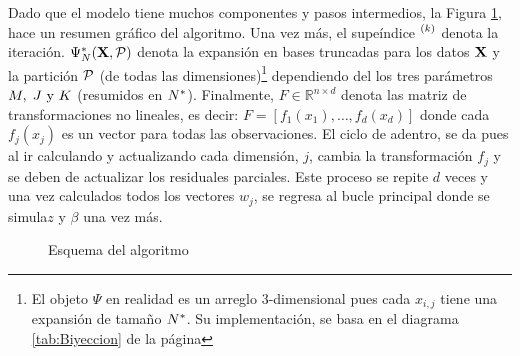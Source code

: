 \documentclass[../Main/Main.tex]{subfiles}
\begin{document}
Dado que el modelo tiene muchos componentes y pasos intermedios, la Figura \ref{fig:DiagramaAlgoritmo}, hace un resumen gráfico del algoritmo. Una vez más, el supeíndice $\iter{k}$ denota la iteración. $\Psi_\N(\xmat, \P)$ denota la expansión en bases truncadas para los datos $\xmat$ y la partición $\P$ (de todas las dimensiones)\footnote{El objeto $\Psi$ en realidad es un arreglo 3-dimensional pues cada $x_{i,j}$ tiene una expansión de tamaño $\N$. Su implementación, se basa en el diagrama \ref{tab:Biyeccion} de la página \pageref{tab:Biyeccion}} dependiendo del los tres parámetros $\MJK$ (resumidos en $\N$). Finalmente, $F\in\mathbb{R}^{n\times d}$ denota las matriz de transformaciones no lineales, es decir: $F = [f_1(x_1),\ldots,f_d(x_d)]$ donde cada $f_j(x_j)$ es un vector para todas las observaciones. El ciclo de adentro, se da pues al ir calculando y actualizando cada dimensión, $j$, cambia la transformación $f_j$ y se deben de actualizar los residuales parciales. Este proceso se repite $d$ veces y una vez calculados todos los vectores $w_j$, se regresa al bucle principal donde se simula$z$ y $\beta$ una vez más. \\

\begin{figure}[h]
\centering
{}
\caption{Esquema del algoritmo}
\label{fig:DiagramaAlgoritmo}
\end{figure}
\end{document}
